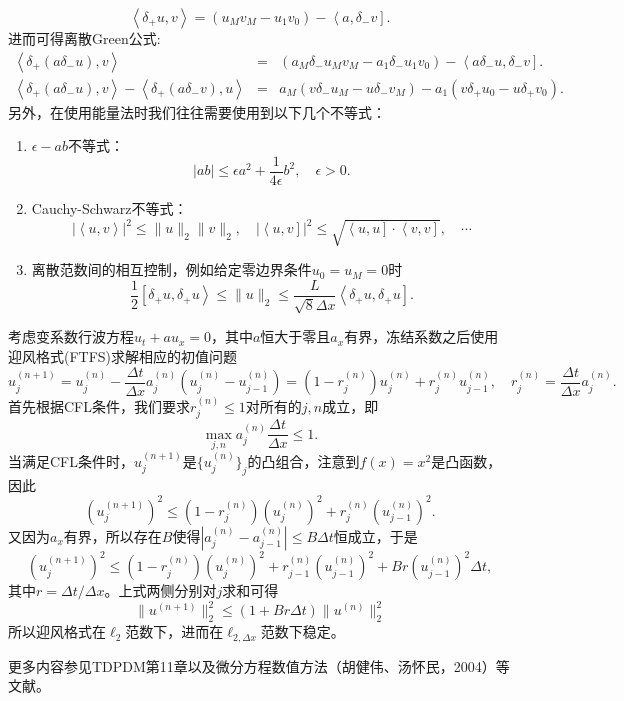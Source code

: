 \documentclass[a4paper,10pt]{ctexart}
\begin{document}
\begin{equation}
    \left<\delta_{+}u,v\right> = (u_Mv_M-u_1v_0) - \left<a, \delta_-v\right].
\end{equation}
进而可得离散Green公式:
\begin{eqnarray}
    \left<\delta_+(a \delta_- u), v\right> &=& (a_M \delta_-u_M v_M - a_1\delta_-u_1v_0) - \left<a\delta_-u, \delta_-v\right].\\
    \left<\delta_+(a \delta_- u), v\right> - \left<\delta_+(a \delta_- v), u\right> &=& a_M(v \delta_-u_M-u\delta_-v_M) - a_1(v\delta_+u_0-u\delta_+v_0).
\end{eqnarray}
另外，在使用能量法时我们往往需要使用到以下几个不等式：
\begin{enumerate}
    \item $ \epsilon-ab $不等式：
    \begin{equation}
        |ab| \leqslant \epsilon a^2 + \frac{1}{4 \epsilon}b^2,\quad \epsilon>0.
    \end{equation}
    \item Cauchy-Schwarz不等式：
    \begin{equation}
        |\left<u, v\right>|^2\leqslant \| u \|_2\| v \|_2,\quad |\left<u,v \right]|^2\leqslant \sqrt{\left<u,u \right] \cdot \left<v,v \right]} ,\quad \cdots 
    \end{equation}
    \item 离散范数间的相互控制，例如给定零边界条件$ u_0=u_M=0 $时
    \begin{equation}
        \frac{1}{2}\left[\delta_+ u, \delta_+ u\right>\leqslant \| u \|_2 \leqslant \frac{L}{\sqrt{8} \Delta x}\left<\delta_+ u, \delta_+ u\right].
    \end{equation}
\end{enumerate}
\begin{example}
    考虑变系数行波方程$ u_t + au_x = 0 $，其中$ a $恒大于零且$ a_x $有界，冻结系数之后使用迎风格式(FTFS)求解相应的初值问题
    \[
        u^{(n+1)}_j = u^{(n)}_j - \frac{\Delta t}{\Delta x}a_j^{(n)}(u^{(n)}_j - u^{(n)}_{j-1}) = (1-r_j^{(n)})u^{(n)}_j + r_j^{(n)}u^{(n)}_{j-1},\quad r_j^{(n)} = \frac{\Delta t}{\Delta x}a_j^{(n)}.
    \]
    首先根据CFL条件，我们要求$ r_j^{(n)}\leqslant 1 $对所有的$ j,n $成立，即
    \[
        \max_{j,n} a_j^{(n)} \frac{\Delta t}{\Delta x} \leqslant 1.  
    \]
    当满足CFL条件时，$ u^{(n+1)}_j $是$ \{u^{(n)}_j\}_j $的凸组合，注意到$ f(x)=x^2 $是凸函数，因此
    \[
        (u^{(n+1)}_j)^2 \leqslant (1-r_j^{(n)})(u^{(n)}_j)^2 + r_j^{(n)}(u^{(n)}_{j-1})^2.
    \]
    又因为$ a_x $有界，所以存在$ B $使得$ |a^{(n)}_j-a^{(n)}_{j-1}|\leqslant B \Delta t $恒成立，于是
    \[
        (u^{(n+1)}_j)^2 \leqslant (1-r_j^{(n)})(u^{(n)}_j)^2 + r_{j-1}^{(n)}(u^{(n)}_{j-1})^2 + Br(u^{(n)}_{j-1})^2 \Delta t,
    \]
    其中$ r = \Delta t / \Delta x $。上式两侧分别对$ j $求和可得
    \[
        \| u^{(n+1)} \|_2^2 \leqslant (1+Br \Delta t)\| u^{(n)} \|_2^2
    \]
    所以迎风格式在$ \ell_2 $范数下，进而在$ \ell_{2,\Delta x} $范数下稳定。
\end{example}
更多内容参见TDPDM第11章以及微分方程数值方法（胡健伟、汤怀民，2004）等文献。
\end{document}
